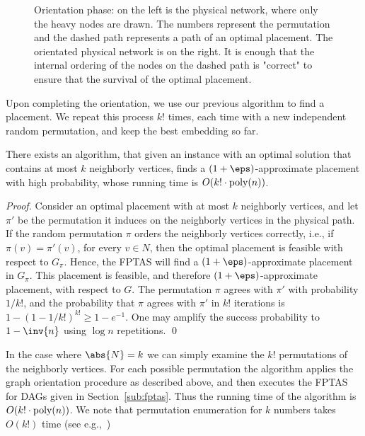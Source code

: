 \begin{figure}[t]
\centering
{}
\caption{Orientation phase: on the left is the physical network, where
  only the heavy nodes are drawn.  The numbers represent the
  permutation and the dashed path represents a path of an optimal
  placement.  The orientated physical network is on the right.  It is
  enough that the internal ordering of the nodes on the dashed path is
  "correct" to ensure that the survival of the optimal placement. }
\label{fig:orientation}
\end{figure}

Upon completing the orientation, we use our previous algorithm to find
a placement.  We repeat this process $k!$ times, each time with a new
independent random permutation, and keep the best embedding so far.

\begin{theorem}
There exists an algorithm, that given an \scp instance with an optimal
solution that contains at most $k$ neighborly vertices, finds a
$(1+\eps)$-approximate placement with high probability, whose
running time is $O(k! \cdot \text{\rm poly}(n))$.
\end{theorem}
\begin{proof}
Consider an optimal placement with at most $k$ neighborly vertices,
and let $\pi'$ be the permutation it induces on the neighborly
vertices in the physical path.
%
If the random permutation $\pi$ orders the neighborly vertices
correctly, i.e., if $\pi(v) = \pi'(v)$, for every $v \in N$, then the
optimal placement is feasible with respect to $G_\pi$.  Hence, the
FPTAS will find a $(1+\eps)$-approximate placement in $G_\pi$.  This
placement is feasible, and therefore $(1+\eps)$-approximate placement,
with respect to $G$.
%
The permutation $\pi$ agrees with $\pi'$ with probability $1/k!$, and
the probability that $\pi$ agrees with $\pi'$ in $k!$ iterations is $1
- (1 - 1/k!)^{k!} \geq 1 - e^{-1}$.  One may amplify the success
probability to $1 - \inv{n}$ using $\log n$ repetitions.
%
\qed
\end{proof}

In the case where $\abs{N} = k$ we can simply examine the $k!$
permutations of the neighborly vertices.  For each possible
permutation the algorithm applies the graph orientation procedure as
described above, and then executes the FPTAS for DAGs given in
Section~\ref{sub:fptas}.  
Thus the running time of the algorithm is $O(k! \cdot \text{\rm poly}(n))$.
%
We note that permutation enumeration for $k$ numbers takes $O(k!)$
time (see e.g.,~\cite{Even73,Sedgewick77})

